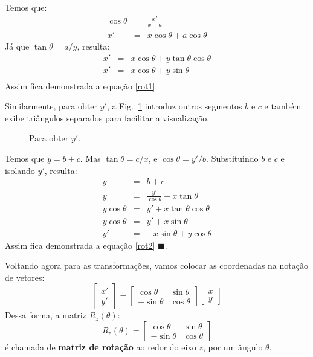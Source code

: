 \noindent Temos que:
\begin{eqnarray*}
\cos \theta &=& \frac{x'}{x+a} \\
x' &=& x \cos \theta + a \cos \theta
\end{eqnarray*}
%
Já que $\tan \theta = a / y$, resulta:
\begin{eqnarray*}
x' &=& x \cos \theta + y \tan \theta \cos \theta \\
x' &=& x \cos \theta + y \sin \theta \\
\end{eqnarray*}
%
Assim fica demonstrada a equação \ref{rot1}.

Similarmente, para obter $y'$, a Fig.~\ref{fig:roteixosy} introduz outros segmentos $b$ e $c$ e também exibe triângulos separados para facilitar a visualização.
%
\begin{figure}
\centering
\qquad
\qquad

\caption{Para obter $y'$.}
\label{fig:roteixosy}
\end{figure}
%
Temos que $y = b+c$. Mas $\tan \theta = c/x$, e $\cos \theta = y'/b$. Substituindo $b$ e $c$ e isolando $y'$, resulta:
\begin{eqnarray*}
y &=& b+c \\
y &=& \frac{y'}{\cos \theta} + x \tan \theta \\
y \cos \theta &=& y' + x \tan \theta \cos \theta \\
y \cos \theta &=& y' + x \sin \theta \\
y' &=& -x \sin \theta + y \cos \theta
\end{eqnarray*}
%
Assim fica demonstrada a equação \ref{rot2} $\blacksquare$.

\vspace{1cm}

Voltando agora para as transformações, vamos colocar as coordenadas na notação de vetores:
%
\begin{equation}
\begin{bmatrix}
x'\\
y'
\end{bmatrix}
=
\begin{bmatrix}
\cos \theta & \sin \theta \\
-\sin \theta & \cos \theta 
\end{bmatrix}
\begin{bmatrix}
x\\
y
\end{bmatrix}
\end{equation}
%
\noindent Dessa forma, a matriz $R_z(\theta)$:
%
\begin{equation}
R_z(\theta) =
\begin{bmatrix}
\cos \theta & \sin \theta \\
-\sin \theta & \cos \theta 
\end{bmatrix}
\end{equation}
%
é chamada de \textbf{matriz de rotação} ao redor do eixo $z$, por um ângulo $\theta$.

